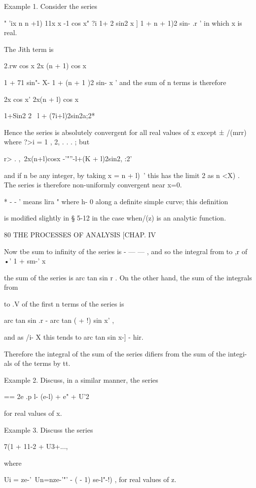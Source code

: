 Example 1. Consider the series 

" 'ix n n +1) 11x x -1  cos x"  
 ?i  1+  2 sin2 x ]  1 +  n + 1)2 sin-  .r   ' 
in which x is real. 

The Jith term is 

2.rw cos x  2x (n + 1) cos x  



1 + 71  sin"-  X- 1 + (n + 1 )2 sin- x  ' 
and the sum of n terms is therefore 

2x cos x'  2x(n + l) cos x  

1+Sin2 2~ l + (7i+l)2sin2a;2* 

Hence the series is absolutely convergent for all real values of x except ±  /(mrr) 
where ?>i = 1 , 2, . . . ; but 

r> . ,\  2x(n+l)cosx  
   -'"''-l+(K + l)2sin2, :2' 

and if n be any integer, by taking x =  n + l)~'  this has the limit 2 as n <X) . The series is 
therefore non-uniformly convergent near x=0. 

* - - ' means lira "     where h- 0 along a definite simple curve; this definition 

is modified slightly in § 5-12 in the case when/(z) is an analytic function. 



80 THE PROCESSES OF ANALYSIS [CHAP. IV 

Now tbe sum to infinity of the series is -  — —   , and so the integral from to ,r of 
•' 1 + sm-' x  

the sum of the series is arc tan  sin r  . On the other hand, the sum of the integrals from 

to .V of the first n terms of the series is 

arc tan  sin .r   - arc tan  (  + !) sin x'  , 

and as /i-  X this tends to arc tan  sin x-] - hir. 

Therefore the integral of the sum of the series difiers from the sum of the integi-als of 
the terms by  tt. 

Example 2. Discuss, in a similar manner, the series 

== 2e .p l- (e-l) + e" + U'2  

for real values of x. 

Example 3. Discuss the series 

7(1 + 11-2 + U3+..., 

where 

Ui = ze-'\ Un=nze-'"'  - (  - 1) se-l"-!) , 
for real values of z. 

